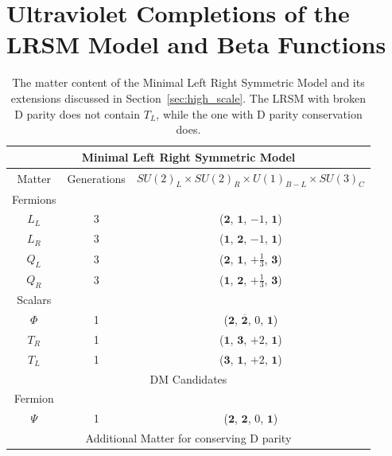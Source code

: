 \documentclass[11pt]{article}
\begin{document}
\appendix
\section{Ultraviolet Completions of the LRSM Model and Beta Functions
\label{app:beta_functions}}
\begin{table}[h]
\caption{The matter content of the Minimal Left Right Symmetric Model and its extensions discussed in Section~\ref{sec:high_scale}. The LRSM with broken D parity does not contain $T_L$, while the one with D parity conservation does.
\label{tb:LRSM_MC} }\vspace*{0.1cm}
\renewcommand{\arraystretch}{1.0}
\centering
\begin{tabular}{|c@{\hskip .66cm}c@{\hskip .66cm}c|}
\hline
\hline
 \multicolumn{3}{c}{
Minimal Left Right Symmetric Model }\\
\hline
Matter & Generations &  $SU(2)_L \times SU(2)_R \times U(1)_{B-L} \times  SU(3)_C $\\
\hline
Fermions & & \\
$L_L$ & 3 & ($\mathbf{2}$, $\mathbf{1}$, $-1 $, $\mathbf{1}$) \\
$L_R$ & 3 & ($\mathbf{1}$, $\mathbf{2}$, $-1$, $\mathbf{1}$) \\
$Q_L$ & 3 & ($\mathbf{2}$, $\mathbf{1}$, $+\frac{1}{3}$, $\mathbf{3}$) \\
$Q_R$ & 3 & ($\mathbf{1}$, $\mathbf{2}$, $+\frac{1}{3}$, $\mathbf{3}$) \\
Scalars &   &  \\
$\Phi$ & 1  & ($\mathbf{2}$, $\overline{\mathbf{2}}$, $0$, $\mathbf{1}$) \\
$T_R$ & 1 & ($\mathbf{1}$, $\mathbf{3}$, $+2$, $\mathbf{1}$) \\
$T_L$ & 1  & ($\mathbf{3}$, $\mathbf{1}$, $+2$,  $\mathbf{1}$) \\
\hline
\hline
 \multicolumn{3}{c}{DM Candidates}\\
 \hline
Fermion  &  & \\
$\Psi$ &  1  & ($\mathbf{2}$, $\mathbf{2}$, $0$, $\mathbf{1}$) \\[.1cm] \hline
\hline
\hline
\multicolumn{3}{c}{Additional Matter for conserving D parity}\\

\end{tabular}
\end{table}
\end{document}
